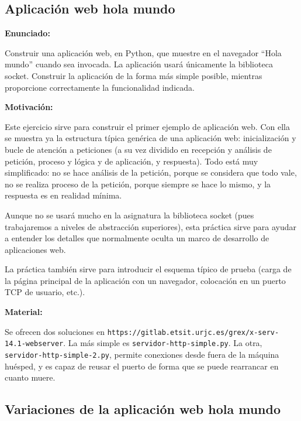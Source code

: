 \subsection{Aplicación web hola mundo}
\label{subsec:aplweb-hola-mundo}

\textbf{Enunciado:}

Construir una aplicación web, en Python, que muestre en el navegador ``Hola mundo'' cuando sea invocada. La aplicación usará únicamente la biblioteca socket. Construir la aplicación de la forma más simple posible, mientras proporcione correctamente la funcionalidad indicada.

\textbf{Motivación:}

Este ejercicio sirve para construir el primer ejemplo de aplicación web. Con ella se muestra ya la estructura típica genérica de una aplicación web: inicialización y bucle de atención a peticiones (a su vez dividido en recepción y análisis de petición, proceso y lógica y de aplicación, y respuesta). Todo está muy simplificado: no se hace análisis de la petición, porque se considera que todo vale, no se realiza proceso de la petición, porque siempre se hace lo mismo, y la respuesta es en realidad mínima.

Aunque no se usará mucho en la asignatura la biblioteca socket (pues trabajaremos a niveles de abstracción superiores), esta práctica sirve para ayudar a entender los detalles que normalmente oculta un marco de desarrollo de aplicaciones web.

La práctica también sirve para introducir el esquema típico de prueba (carga de la página principal de la aplicación con un navegador, colocación en un puerto TCP de usuario, etc.).

\textbf{Material:}

Se ofrecen dos soluciones en \verb|https://gitlab.etsit.urjc.es/grex/x-serv-14.1-webserver|. La más simple es \verb|servidor-http-simple.py|. La otra, \verb|servidor-http-simple-2.py|, permite conexiones desde fuera de la máquina huésped, y es capaz de reusar el puerto de forma que se puede rearrancar en cuanto muere.


\subsection{Variaciones de la aplicación web hola mundo}
\label{subsec:aplweb-hola-mundo-var}


